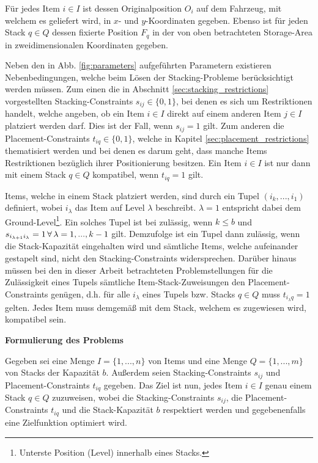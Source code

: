 \pagebreak

Für jedes Item $i \in I$ ist dessen Originalposition $O_i$ auf dem Fahrzeug, mit welchem es geliefert wird,
in $x$- und $y$-Koordinaten gegeben. Ebenso ist für jeden Stack $q \in Q$ dessen fixierte Position $F_q$ in der von oben betrachteten Storage-Area in zweidimensionalen Koordinaten gegeben.

Neben den in Abb. \ref{fig:parameters} aufgeführten Parametern existieren Nebenbedingungen, welche beim Lösen der Stacking-Probleme
berücksichtigt werden müssen. Zum einen die in Abschnitt \ref{sec:stacking_restrictions} vorgestellten Stacking-Constraints
$s_{ij} \in \{0, 1\}$, bei denen es sich um Restriktionen handelt, welche angeben, ob ein Item $i \in I$ direkt auf einem anderen Item $j \in I$ platziert werden darf. Dies ist der Fall, wenn $s_{ij} = 1$ gilt.
Zum anderen die Placement-Constraints $t_{iq} \in \{0, 1\}$, welche in Kapitel \ref{sec:placement_restrictions} thematisiert werden und bei denen es darum geht, dass manche Items Restriktionen bezüglich ihrer Positionierung besitzen. Ein Item $i \in I$ ist nur dann mit einem Stack $q \in Q$ kompatibel, wenn $t_{iq} = 1$ gilt.

Items, welche in einem Stack platziert werden, sind durch ein Tupel $(i_k, ..., i_1)$ definiert, wobei
$i_\lambda$ das Item auf Level $\lambda$ beschreibt. $\lambda = 1$ entspricht dabei dem
Ground-Level\footnote{Unterste Position (Level) innerhalb eines Stacks.}.
Ein solches Tupel ist bei \citet{Bruns2015} zulässig, wenn $k \leq b$ und $s_{i_{\lambda + 1} i_\lambda} = 1
\thinspace \forall \thinspace \lambda = 1, ... , k - 1$ gilt.
Demzufolge ist ein Tupel dann zulässig, wenn die Stack-Kapazität eingehalten wird und sämtliche Items,
welche aufeinander gestapelt sind, nicht den Stacking-Constraints widersprechen. Darüber hinaus müssen bei den in dieser
Arbeit betrachteten Problemstellungen für die Zulässigkeit eines Tupels sämtliche Item-Stack-Zuweisungen
den Placement-Constraints genügen, d.h. für alle $i_\lambda$ eines Tupels bzw. Stacks $q \in Q$ muss
$t_{i_\lambda q} = 1$ gelten. Jedes Item muss demgemäß mit dem Stack, welchem es zugewiesen wird, kompatibel sein.
\newline

\textbf{Formulierung des Problems}

Gegeben sei eine Menge $I = \{1, ..., n\}$ von Items und eine Menge $Q = \{1, ..., m\}$ von Stacks der Kapazität $b$.
Außerdem seien Stacking-Constraints $s_{ij}$ und Placement-Constraints $t_{iq}$ gegeben.
Das Ziel ist nun, jedes Item $i \in I$ genau einem Stack $q \in Q$ zuzuweisen, wobei die Stacking-Constraints $s_{ij}$,
die Placement-Constraints $t_{iq}$ und die Stack-Kapazität $b$ respektiert werden und gegebenenfalls eine Zielfunktion
optimiert wird.

